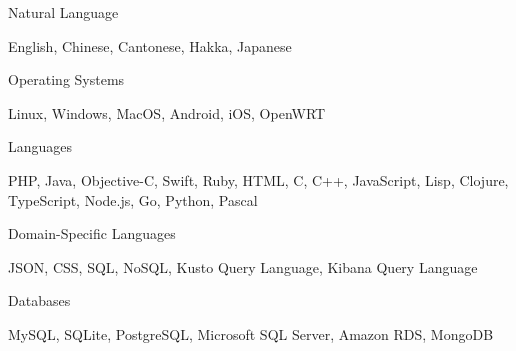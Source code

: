 

\begin{cventries}

  \cventry
    {Natural Language} %
    {} %
    {} %
    {} %
    {
      \begin{cvitems}
        \item {English, Chinese, Cantonese, Hakka, Japanese}
      \end{cvitems}
    }

  \cventry
    {Operating Systems} %
    {} %
    {} %
    {} %
    {
      \begin{cvitems}
        \item {Linux, Windows, MacOS, Android, iOS, OpenWRT}
      \end{cvitems}
    }

  \cventry
    {Languages} %
    {} %
    {} %
    {} %
    {
      \begin{cvitems}
        \item {PHP, Java, Objective-C, Swift, Ruby, HTML, C, C++, JavaScript, Lisp, Clojure, TypeScript, Node.js, Go, Python, Pascal}
      \end{cvitems}
    }

  \cventry
    {Domain-Specific Languages} %
    {} %
    {} %
    {} %
    {
      \begin{cvitems}
        \item {JSON, CSS, SQL, NoSQL, Kusto Query Language, Kibana Query Language}
      \end{cvitems}
    }

  \cventry
    {Databases} %
    {} %
    {} %
    {} %
    {
      \begin{cvitems}
        \item {MySQL, SQLite, PostgreSQL, Microsoft SQL Server, Amazon RDS, MongoDB}
      \end{cvitems}
    }


\end{cventries}
